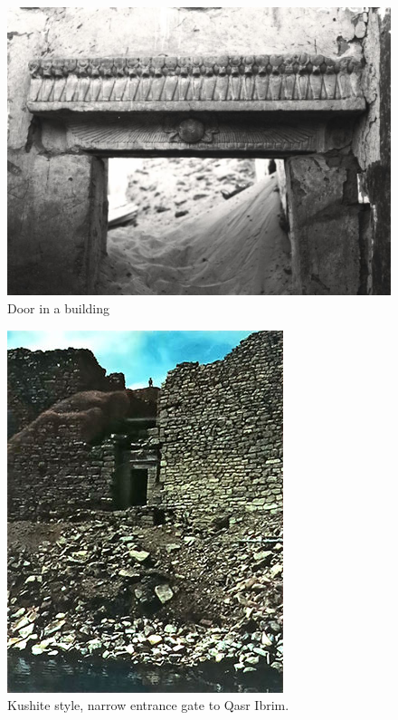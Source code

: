 \documentclass[a4paper,12pt]{scrreprt}
\begin{document}
\begin{figure}[H]
	\centering
	\includegraphics[width=\textwidth]{img/doors/stone_door}
	\caption{Door in a building}
\end{figure}

\begin{figure}[H]
	\centering
	\includegraphics[width=\textwidth]{img/walls_gates/qasr_ibrim_gate}
	\caption{Kushite style, narrow entrance gate to Qasr Ibrim.}
\end{figure}
\end{document}
